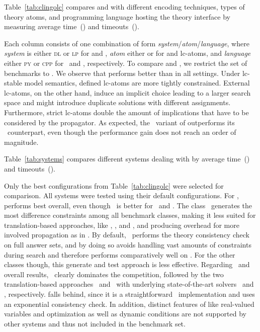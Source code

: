 Table~\ref{tab:clingolc} compares  and  with different 
encoding techniques, 
types of theory atoms, and 
programming language hosting the theory interface
by measuring average time~(\T) and timeouts~(\TO).

Each column consists of one combination of form \emph{system}/\emph{atom}/\emph{language}, 
where
\emph{system} is either \textsc{dl} or \textsc{lp} for  and ,
\emph{atom} either  or  for  and  lc-atoms,
and
\emph{language} either \textsc{py} or \textsc{cpp} for \python\ and \cpp, respectively.
To compare  and , we restrict the set of benchmarks to \dl.
We observe that  performs better than  in all settings.
Under lc-stable model semantics, defined lc-atoms are more tightly constrained.
External lc-atoms, on the other hand, induce an implicit choice leading to a
larger search space and might introduce duplicate solutions with different assignments.
Furthermore, strict lc-atoms double the amount of implications 
that have to be considered by the propagator.
As expected, the \cpp\ variant of  outperforms its \python\ counterpart,
even though the performance gain does not reach an order of magnitude.

Table~\ref{tab:systems} compares different systems dealing with 
by average time~(\T) and timeouts~(\TO).
%

%
Only the best configurations from Table~\ref{tab:clingolc} were selected for comparison.
All systems were tested using their default configurations.
For \dl{},  performs best overall,
even though \clingcon\ is better for \tsp\ and \js.
The class \fs\ generates the most difference constraints among all benchmark classes,
making it less suited for translation-based approaches, like \dingo, \mingo, and \ezsmt,
and producing overhead for more involved propagation as in \clingcon.
By default, \ezcsp\ performs the theory consistency check on full answer sets,
and by doing so avoids handling vast amounts of constraints during search
and therefore performs comparatively well on \fs.
For the other classes though, this generate and test approach is less effective.
Regarding \lc\ and overall results, \clingcon\ clearly dominates the competition,
followed by the two translation-based approaches \mingo\ and \ezsmt\ 
with underlying state-of-the-art solvers \cplex\ and \zzz, respectively.
\clingolc{lp}{dns}{py} falls behind,
since it is a straightforward \python\ implementation
and uses an exponential consistency check.
In addition, distinct features of  like real-valued variables and optimization
as well as dynamic conditions are not supported by other systems 
and thus not included in the benchmark set.

  

